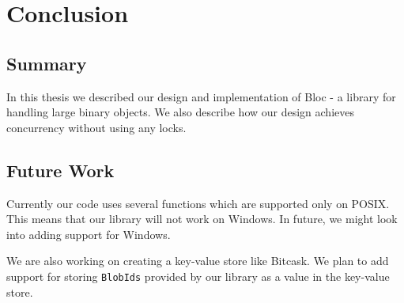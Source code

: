 \chapter{Conclusion}
\label{chap:conclusion}

\section{Summary}
In this thesis we described our design and implementation of Bloc - a library for handling large binary objects.
We also describe how our design achieves concurrency without using any locks.

\section{Future Work}
Currently our code uses several functions which are supported only on POSIX.
This means that our library will not work on Windows. In future, we might look
into adding support for Windows.

We are also working on creating a key-value store like Bitcask. We plan to add support for storing \texttt{BlobIds} provided by our library as a value in the key-value store.
